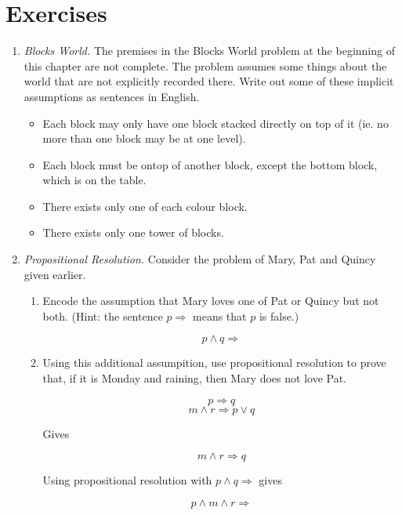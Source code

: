 \documentclass{article}
\begin{document}
\section*{Exercises}

\begin{enumerate}
	\item \emph{Blocks World.} The premises in the Blocks World problem at the beginning of this chapter
	are not complete. The problem assumes some things about the world that are not explicitly recorded there.
	Write out some of these implicit assumptions as sentences in English.
	
	\begin{itemize}
		\item Each block may only have one block stacked directly on top of it (ie. no more than one block may be
			at one level).
			
		\item Each block must be ontop of another block, except the bottom block, which is on the table.
		
		\item There exists only one of each colour block.
		
		\item There exists only one tower of blocks.
	\end{itemize}
	
	\item \emph{Propositional Resolution.} Consider the problem of Mary, Pat and Quincy given earlier.
	\begin{enumerate}
		\item Encode  the assumption that Mary loves one of Pat or Quincy but not both. (Hint: the
			sentence $p \Rightarrow$ means that $p$ is false.)
			
			$$p \wedge q \Rightarrow $$
			
		\item Using this additional assumpition, use propositional resolution to prove that, if it is Monday and
			raining, then Mary does not love Pat.
			
			$$p  \Rightarrow q$$
			$$m \wedge r \Rightarrow p \vee q$$
			
			Gives
			
			$$m \wedge r \Rightarrow q$$
			
			Using propositional resolution with $p \wedge q \Rightarrow$ gives
			
			$$p \wedge m \wedge r \Rightarrow$$
	\end{enumerate}
	
\end{enumerate}
\end{document}
